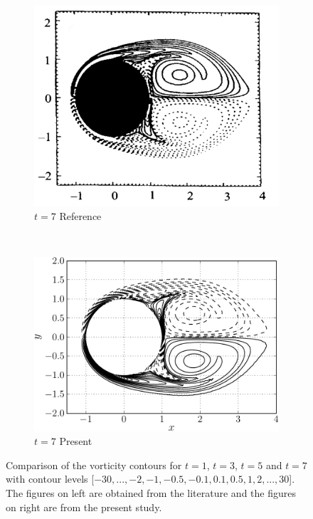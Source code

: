 \begin{figure}[p]
     \begin{subfigure}[t]{0.45\textwidth}
             \includegraphics[height=0.2\textheight]{figures/eulerian/ISC_vorticityContours_t7_ref-mod.png}
             \caption{$t=7$ Reference}
             \label{fig:ISC_vorticityContours_t7_ref}
     \end{subfigure}%
     ~ %
     \begin{subfigure}[t]{0.45\textwidth}
             \includegraphics[height=0.2\textheight]{figures/eulerian/ISC_vorticityContours_t7-crop.pdf}
             \caption{$t=7$ Present}
             \label{fig:ISC_vorticityContours_t7-crop}
     \end{subfigure}         

     \caption{Comparison of the vorticity contours for $t=1$, $t=3$, $t=5$ and $t=7$ with contour levels [$-30,...,-2,-1,-0.5,-0.1,0.1,0.5,1,2,...,30$]. The figures on left are obtained from the literature \cite{Koumoutsakos1995a} and the figures on right are from the present study.}
     \label{fig:ISCS_vorticityContours_comparison}
	\end{figure}
	
